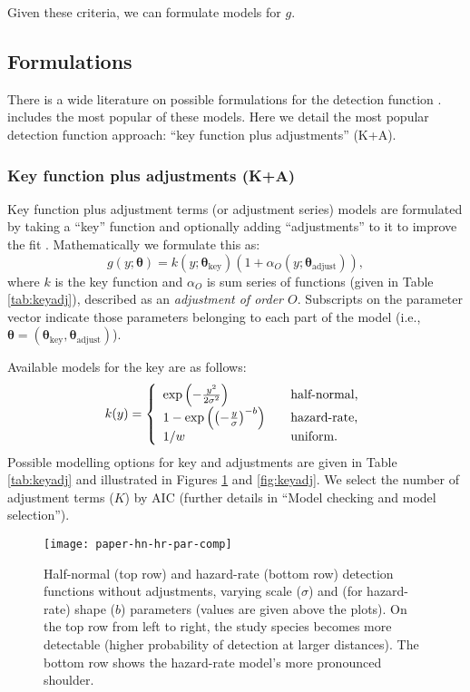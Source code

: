 \documentclass[article]{jss}
\begin{document}
Given these criteria, we can formulate models for $g$.

\subsection{Formulations}

There is a wide literature on possible formulations for the detection function \citep{Buckland:1992fa, Eidous:2005bj, Becker:2009cj, Giammarino:2014eg, Miller:2015hw, Becker:2015fi}.  includes the most popular of these models. Here we detail the most popular detection function approach: ``key function plus adjustments'' (K+A).

\subsubsection{Key function plus adjustments (K+A)}

Key function plus adjustment terms (or adjustment series) models are formulated by taking a ``key'' function and optionally adding ``adjustments'' to it to improve the fit \citep{Buckland:1992fa}. Mathematically we formulate this as:
$$
g(y; \boldsymbol{\theta}) = k(y; \boldsymbol{\theta}_\text{key})\left( 1+ \alpha_O(y; \boldsymbol{\theta}_\text{adjust})\right),
$$
where $k$ is the key function and $\alpha_O$ is sum series of functions (given in Table \ref{tab:keyadj}), described as an \textit{adjustment of order $O$}. Subscripts on the parameter vector indicate those parameters belonging to each part of the model (i.e., $\boldsymbol{\theta} = (\boldsymbol{\theta}_\text{key}, \boldsymbol{\theta}_\text{adjust})$).

Available models for the key are as follows:
$$
k(y) = \left\{
\begin{array}{l l}
  \exp\left(-\frac{y^2}{2 \sigma^2}\right) & \quad \text{half-normal,} \\
  1-\exp\left(\left(-\frac{y}{\sigma}\right)^{-b}\right) & \quad \text{hazard-rate,} \\
  1/w & \quad \text{uniform.}
\end{array} \right.
$$
Possible modelling options for key and adjustments are given in Table \ref{tab:keyadj} and illustrated in Figures \ref{fig:hnhr} and \ref{fig:keyadj}. We select the number of adjustment terms ($K$) by AIC (further details in ``Model checking and model selection'').

\begin{figure}
\begin{center}
\texttt{[image: paper-hn-hr-par-comp]}
\caption{Half-normal (top row) and hazard-rate (bottom row) detection functions without adjustments, varying scale ($\sigma$) and (for hazard-rate) shape ($b$) parameters (values are given above the plots). On the top row from left to right, the study species becomes more detectable (higher probability of detection at larger distances). The bottom row shows the hazard-rate model's more pronounced shoulder.}
\label{fig:hnhr}
\end{center}
\end{figure}
\end{document}
